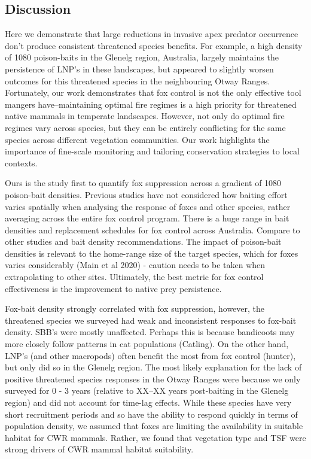 \documentclass[11pt,a4paper,titlepage,twoside,openright]{style/unimelbthesis}
\begin{document}
\begin{mainmatter}
\hypertarget{discussion-1}{%
\section{Discussion}\label{discussion-1}}

Here we demonstrate that large reductions in invasive apex predator occurrence don't produce consistent threatened species benefits. For example, a high density of 1080 poison-baits in the Glenelg region, Australia, largely maintains the persistence of LNP's in these landscapes, but appeared to slightly worsen outcomes for this threatened species in the neighbouring Otway Ranges. Fortunately, our work demonstrates that fox control is not the only effective tool mangers have--maintaining optimal fire regimes is a high priority for threatened native mammals in temperate landscapes. However, not only do optimal fire regimes vary across species, but they can be entirely conflicting for the same species across different vegetation communities. Our work highlights the importance of fine-scale monitoring and tailoring conservation strategies to local contexts.

Ours is the study first to quantify fox suppression across a gradient of 1080 poison-bait densities. Previous studies have not considered how baiting effort varies spatially when analysing the response of foxes and other species, rather averaging across the entire fox control program. There is a huge range in bait densities and replacement schedules for fox control across Australia. Compare to other studies and bait density recommendations.
The impact of poison-bait densities is relevant to the home-range size of the target species, which for foxes varies considerably (Main et al 2020) - caution needs to be taken when extrapolating to other sites. Ultimately, the best metric for fox control effectiveness is the improvement to native prey persistence.

Fox-bait density strongly correlated with fox suppression, however, the threatened species we surveyed had weak and inconsistent responses to fox-bait density. SBB's were mostly unaffected. Perhaps this is because bandicoots may more closely follow patterns in cat populations (Catling). On the other hand, LNP's (and other macropods) often benefit the most from fox control (hunter), but only did so in the Glenelg region. The most likely explanation for the lack of positive threatened species responses in the Otway Ranges were because we only surveyed for 0 - 3 years (relative to XX--XX years post-baiting in the Glenelg region) and did not account for time-lag effects. While these species have very short recruitment periods and so have the ability to respond quickly in terms of population density, we assumed that foxes are limiting the availability in suitable habitat for CWR mammals. Rather, we found that vegetation type and TSF were strong drivers of CWR mammal habitat suitability.


\end{mainmatter}
\end{document}
